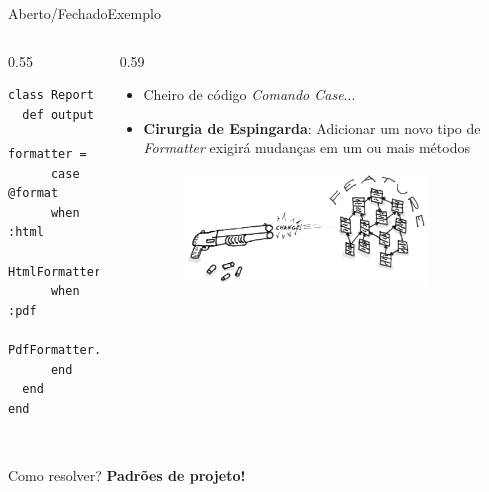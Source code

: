 \documentclass[10pt]{beamer}
\begin{document}
\begin{frame}[fragile]{Aberto/Fechado}{Exemplo}
\begin{columns}

\begin{column}{0.55\textwidth}
\lstset {
  basicstyle=\small
}

\begin{lstlisting}
class Report
  def output
    formatter = 
      case @format
      when :html
        HtmlFormatter.new(self)
      when :pdf
        PdfFormatter.new(self)
      end
  end
end
\end{lstlisting}
\end{column}

\pause

\begin{column}{0.59\textwidth}
  \begin{itemize}
    \item Cheiro de código \textit{Comando Case}...
    \pause
    \item \textbf{Cirurgia de Espingarda}: Adicionar um novo tipo de \textit{Formatter} exigirá mudanças em um ou mais métodos
    \begin{figure}
      \includegraphics[width=0.85\textwidth]{images/shotgunSurgery.png}
    \end{figure}
  \end{itemize}
\end{column}

\end{columns}

\pause
\centering ~\\ Como resolver?
\pause \large \textbf{Padrões de projeto!}

\end{frame}

\end{document}
